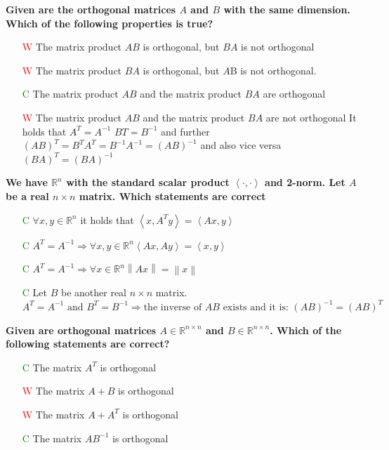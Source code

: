 \documentclass[7pt,landscape, margin = 0.1mm]{article}
\begin{document}
\begin{multicols}{4}
\begin{flushleft}
\begin{itemize}
\end{itemize}
\hspace{3mm}
\textbf{ Given are the orthogonal matrices $A$ and $B$ with the same dimension. Which of the following properties
is true? }
\begin{itemize}
\item[\textcolor{red}{W}] The matrix product $AB$ is orthogonal, but $BA$ is not orthogonal
\item[\textcolor{red}{W}] The matrix product $ BA$ is orthogonal, but $A$B is not orthogonal.
\item[\textcolor{green}{C}] The matrix product $AB$ and the matrix product $BA$ are orthogonal
\item[\textcolor{red}{W}] The matrix product $AB$ and the matrix product $BA$ are not orthogonal
\textcolor{Emerald}{It holds that $A^T = A^{-1}$ $BT = B^{-1}$ and further $(AB)^T = B^TA^T = B^{-1}A^{-1} =
(AB)^{-1}$ and also vice versa $(BA)^T = (BA)^{-1}$}
\end{itemize}

\hspace{3mm}
\textbf{We have $\mathbb{R}^n $ with the standard scalar product $ \left<\cdot ,\cdot \right>$ and 2-norm. Let $A$ be a real $n \times n $ matrix. Which statements are correct}
\begin{itemize}
\item[\textcolor{green}{C}] $\forall x,y \in \mathbb{R}^n$ it holds that $ \left<x,A^Ty \right>=\left<Ax,y \right> $
\item[\textcolor{green}{C}] $A^T=A^{-1} \Rightarrow  \forall x,y \in \mathbb{R}^n \left<Ax,Ay \right>=\left<x,y \right> $
\item[\textcolor{green}{C}] $A^T=A^{-1} \Rightarrow  \forall x\in \mathbb{R}^n \left\|Ax \right\| = \left\| x\right\| $
\item[\textcolor{green}{C}] Let  $B $ be another real $n \times n $ matrix. $A^T=A^{-1} \text{ and }  B^T=B^{-1}\Rightarrow \text{the inverse of } AB \text{ exists and it is: } (AB)^{-1} = (AB)^T$  
 
\end{itemize}
\hspace{3mm}

\textbf{Given are orthogonal matrices $A  \in \mathbb{R}^{n \times n} $ and $B  \in \mathbb{R}^{n \times n} $. Which of the following statements are
correct?  }
\begin{itemize}
\item[\textcolor{green}{C}] The matrix $A^T$ is orthogonal
\item[\textcolor{red}{W}] The matrix $A + B$ is orthogonal
\item[\textcolor{red}{W}]  The matrix $A + A^T$ is orthogonal
\item[\textcolor{green}{C}] The matrix $AB^{-1}$ is orthogonal 
 

\end{itemize}
\end{flushleft}
\end{multicols}
\end{document}
